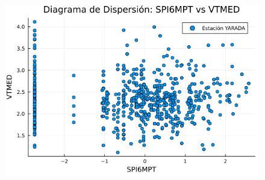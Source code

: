 \begin{figure}[htbp]
\begin{minipage}{0.32\textwidth}
    \includegraphics[width=\linewidth]{Capitulos/Scaterplot/YARADA_SPI6MPT_vs_VTMED.png}
\end{minipage}

\vspace{0.5cm}  %


\end{figure}
